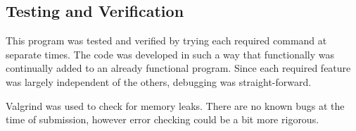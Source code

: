 \documentclass[11pt,a4paper]{article}
\newcommand{\nl}{\vspace{10pt}}
\begin{document}

\subsection*{Testing and Verification}

This program was tested and verified by trying each required command at separate times. The code was developed in such a way that functionally was continually added to an already functional program. Since each required feature was largely independent of the others, debugging was straight-forward.\nl

Valgrind was used to check for memory leaks. There are no known bugs at the time of submission, however error checking could be a bit more rigorous. 
\end{document}
